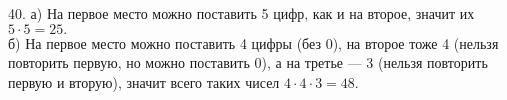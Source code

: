 40. а) На первое место можно поставить 5 цифр, как и на второе, значит их $5\cdot5=25.$\\
б) На первое место можно поставить 4 цифры (без 0), на второе тоже 4 (нельзя повторить первую, но можно поставить 0), а на третье --- 3 (нельзя повторить первую и вторую), значит всего таких чисел $4\cdot4\cdot3=48.$\\
